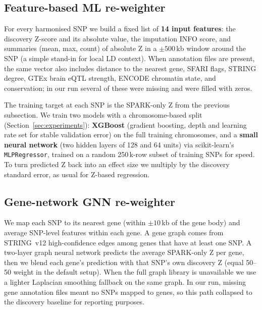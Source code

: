 \subsection{Feature-based ML re-weighter}
\label{sec:mlrew}

For every harmonised SNP we build a fixed list of \textbf{14 input
features}: the discovery Z-score and its absolute value, the imputation
INFO score, and summaries (mean, max, count) of absolute Z in a
$\pm 500$\,kb window around the SNP (a simple stand-in for local LD
context). When annotation files are present, the same vector also
includes distance to the nearest gene, SFARI flags, STRING degree,
GTEx brain eQTL strength, ENCODE chromatin state, and conservation; in
our run several of these were missing and were filled with zeros.

The training target at each SNP is the SPARK-only Z from the previous
subsection. We train two models with a chromosome-based split
(Section~\ref{sec:experiments}): \textbf{XGBoost} (gradient boosting,
depth and learning rate set for stable validation error) on the full
training chromosomes, and a \textbf{small neural network} (two hidden
layers of 128 and 64 units) via scikit-learn's \texttt{MLPRegressor},
trained on a random 250\,k-row subset of training SNPs for speed. To
turn predicted Z back into an effect size we multiply by the discovery
standard error, as usual for Z-based regression.

\subsection{Gene-network GNN re-weighter}
\label{sec:gnn}

We map each SNP to its nearest gene (within $\pm 10$\,kb of the gene
body) and average SNP-level features within each gene. A gene graph
comes from STRING~v12 high-confidence edges among genes that have at
least one SNP. A two-layer graph neural network predicts the average
SPARK-only Z per gene, then we blend each gene's prediction with that
SNP's own discovery Z (equal 50--50 weight in the default setup). When
the full graph library is unavailable we use a lighter Laplacian
smoothing fallback on the same graph. In our run, missing gene
annotation files meant no SNPs mapped to genes, so this path
collapsed to the discovery baseline for reporting purposes.
